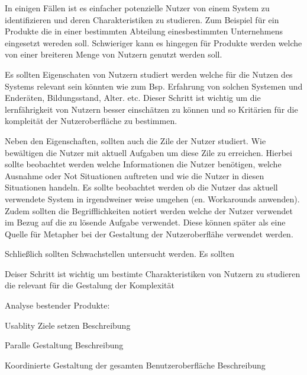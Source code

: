 In einigen Fällen ist es einfacher potenzielle Nutzer von einem System zu identifizieren und deren Charakteristiken zu studieren. Zum Beispiel für ein Produkte die in einer bestimmten 
Abteilung einesbestimmten Unternehmens eingesetzt wereden soll. Schwieriger kann es hingegen für Produkte werden welche von einer breiteren Menge von Nutzern genutzt werden soll.

Es sollten Eigenschaten von Nutzern studiert werden welche für die Nutzen des Systems relevant sein könnten wie zum Bsp. Erfahrung von solchen Systemen und Enderäten, Bildungsstand, Alter. etc.
Dieser Schritt ist wichtig um die lernfährigkeit von Nutzern besser einschätzen zu können und so Kritärien für die kompleität der Nutzeroberfläche zu bestimmen.

Neben den Eigenschaften, sollten auch die Zile der Nutzer studiert. Wie bewältigen die  Nutzer mit aktuell Aufgaben um diese Zile zu erreichen. Hierbei sollte beobachtet werden welche Informationen 
die Nutzer benötigen, welche Ausnahme oder Not Situationen auftreten und wie die Nutzer in diesen Situationen handeln. Es sollte beobachtet werden ob die Nutzer das aktuell verwendete System in irgendweiner 
weise umgehen (en. Workarounds anwenden). Zudem sollten die Begrifflichkeiten notiert werden welche der Nutzer verwendet im Bezug auf die zu lösende Aufgabe verwendet.  
Diese können später als eine Quelle für Metapher bei der Gestaltung der Nutzeroberflähe verwendet werden. 

Schließlich sollten Schwachstellen untersucht werden. Es sollten 



Deiser Schritt ist wichtig um bestimte Charakteristiken von Nutzern zu studieren die relevant für die Gestalung der Komplexität 


Analyse bestender Produkte: 

		Usablity Ziele setzen  Beschreibung

		Paralle Gestaltung   Beschreibung

		Koordinierte Gestaltung der gesamten Benutzeroberfläche  Beschreibung 

